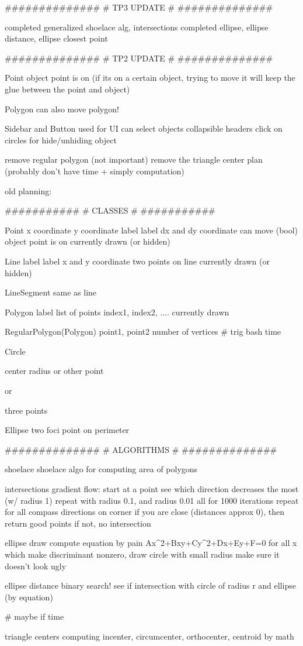 ##############
# TP3 UPDATE #
##############

completed generalized shoelace alg, intersections
completed ellipse, ellipse distance, ellipse closest point

##############
# TP2 UPDATE #
##############

Point {
    object point is on (if its on a certain object, trying to move it will
    keep the glue between the point and object)
}

Polygon {
    can also move polygon!
}

Sidebar and Button {
    used for UI
    can select objects
    collapsible headers
    click on circles for hide/unhiding object
}

remove regular polygon (not important)
remove the triangle center plan (probably don't have time + simply computation)


old planning:

###########
# CLASSES #
###########

Point {
    x coordinate
    y coordinate
    label
    label dx and dy coordinate
    can move (bool)
    object point is on
    currently drawn (or hidden)
}

Line {
    label
    label x and y coordinate
    two points on line
    currently drawn (or hidden)
}

LineSegment {
    same as line
}

Polygon {
    label
    list of points
    index1, index2, ....
    currently drawn
}

RegularPolygon(Polygon) {
    point1, point2
    number of vertices
    # trig bash time
}

Circle {
    center
    radius or other point

    or

    three points
}

Ellipse {
    two foci
    point on perimeter
}

##############
# ALGORITHMS #
##############

shoelace {
    shoelace algo for computing area of polygons
}

intersections {
    gradient flow: 
    start at a point
    see which direction decreases the most (w/ radius 1)
    repeat with radius 0.1, and radius 0.01
    all for 1000 iterations
    repeat for all compass directions on corner
    if you are close (distances approx 0), then return good points
    if not, no intersection
}

ellipse draw {
    compute equation by pain
    Ax^2+Bxy+Cy^2+Dx+Ey+F=0
    for all x which make discriminant nonzero, draw circle with small radius
    make sure it doesn't look ugly
}

ellipse distance {
    binary search!
    see if intersection with circle of radius r and ellipse (by equation)
}

# maybe if time

triangle centers {
    computing incenter, circumcenter, orthocenter, centroid by math
}